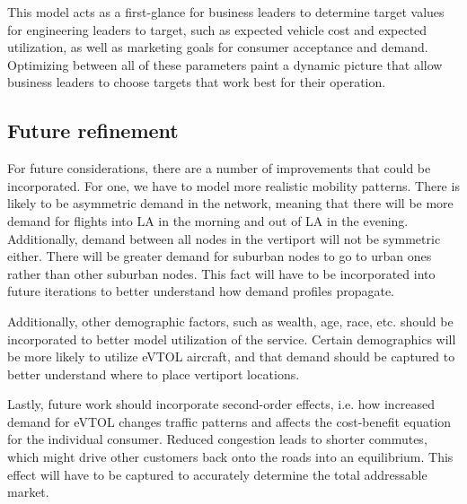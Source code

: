 \documentclass{article}
\begin{document}
This model acts as a first-glance for business leaders to determine target values for engineering leaders to target, such as expected vehicle cost and expected utilization, as well as marketing goals for consumer acceptance and demand. Optimizing between all of these parameters paint a dynamic picture that allow business leaders to choose targets that work best for their operation. 

\subsection{Future refinement}
For future considerations, there are a number of improvements that could be incorporated. For one, we have to model more realistic mobility patterns. There is likely to be asymmetric demand in the network, meaning that there will be more demand for flights into LA in the morning and out of LA in the evening. Additionally, demand between all nodes in the vertiport will not be symmetric either. There will be greater demand for suburban nodes to go to urban ones rather than other suburban nodes. This fact will have to be incorporated into future iterations to better understand how demand profiles propagate.

Additionally, other demographic factors, such as wealth, age, race, etc. should be incorporated to better model utilization of the service. Certain demographics will be more likely to utilize eVTOL aircraft, and that demand should be captured to better understand where to place vertiport locations.

Lastly, future work should incorporate second-order effects, i.e. how increased demand for eVTOL changes traffic patterns and affects the cost-benefit equation for the individual consumer. Reduced congestion leads to shorter commutes, which might drive other customers back onto the roads into an equilibrium. This effect will have to be captured to accurately determine the total addressable market. 

\pagebreak

\begin{appendix}
  \listoffigures
  \listoftables
\end{appendix}
\end{document}
